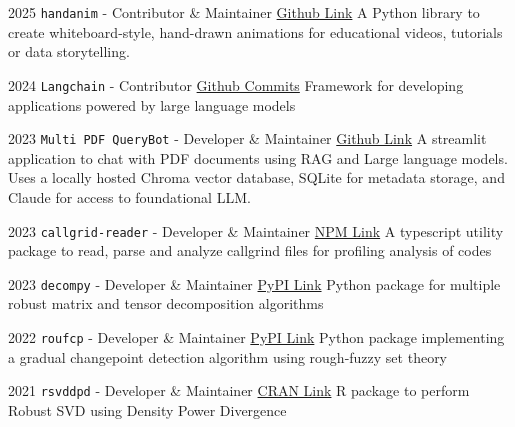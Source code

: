 \documentclass[11pt]{developercv} %
\begin{document}
\pagebreak
{}
\begin{entrylist}
    \vspace{-10pt}
    \entry
    {2025}
    {\texttt{handanim} - Contributor \& Maintainer}
    {\href{https://github.com/subroy13/handanim}{Github Link}}
    {\small A Python library to create whiteboard-style, hand-drawn animations for educational videos, tutorials or data storytelling.}
    
    \vspace*{-5pt}
    \entry
    {2024}
    {\texttt{Langchain} - Contributor}
    {\href{https://github.com/langchain-ai/langchain/commits?author=subroy13}{Github Commits}}
    {\small Framework for developing applications powered by large language models}
    
    \vspace*{-5pt}
    \entry
    {2023}
    {\texttt{Multi PDF QueryBot} - Developer \& Maintainer}
    {\href{https://github.com/subroy13/multi-pdf-querybot}{Github Link}}
    {\small A streamlit application to chat with PDF documents using RAG and Large language models. Uses a locally hosted Chroma vector database, SQLite for metadata storage, and Claude for access to foundational LLM.}
    
    \vspace*{-5pt}
    \entry
    {2023}
    {\texttt{callgrid-reader} - Developer \& Maintainer}
    {\href{https://www.npmjs.com/package/callgrind-reader}{NPM Link}}
    {\small A typescript utility package to read, parse and analyze callgrind files for profiling analysis of codes}
    
    \vspace*{-5pt}
    \entry
    {2023}
    {\texttt{decompy} - Developer \& Maintainer}
    {\href{https://pypi.org/project/decompy/}{PyPI Link}}
    {\small Python package for multiple robust matrix and tensor decomposition algorithms}

    \vspace*{-5pt}
    \entry
    {2022}
    {\texttt{roufcp} - Developer \& Maintainer}
    {\href{https://pypi.org/project/roufcp/}{PyPI Link}}
    {\small Python package implementing a gradual changepoint detection algorithm using rough-fuzzy set theory}
    
    \vspace*{-5pt}
    \entry
    {2021}
    {\texttt{rsvddpd} - Developer \& Maintainer}
    {\href{https://cran.r-project.org/web/packages/rsvddpd/index.html}{CRAN Link}}
    {\small R package to perform Robust SVD using Density Power Divergence}


\end{entrylist}
\end{document}
